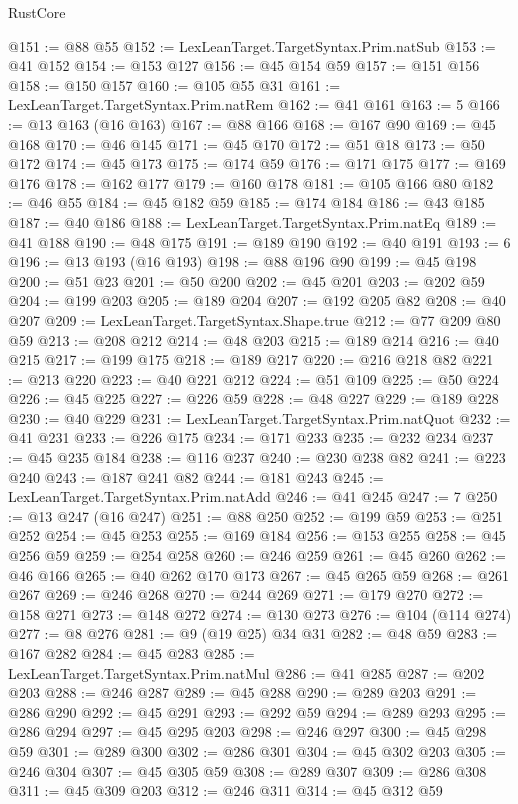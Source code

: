 \begin{lexlean}{RustCore}
\begin{coremodule}
@151 := @88 @55
@152 := LexLeanTarget.TargetSyntax.Prim.natSub
@153 := @41 @152
@154 := @153 @127
@156 := @45 @154 @59
@157 := @151 @156
@158 := @150 @157
@160 := @105 @55 @31
@161 := LexLeanTarget.TargetSyntax.Prim.natRem
@162 := @41 @161
@163 := 5
@166 := @13 @163 (@16 @163)
@167 := @88 @166
@168 := @167 @90
@169 := @45 @168
@170 := @46 @145
@171 := @45 @170
@172 := @51 @18
@173 := @50 @172
@174 := @45 @173
@175 := @174 @59
@176 := @171 @175
@177 := @169 @176
@178 := @162 @177
@179 := @160 @178
@181 := @105 @166 @80
@182 := @46 @55
@184 := @45 @182 @59
@185 := @174 @184
@186 := @43 @185
@187 := @40 @186
@188 := LexLeanTarget.TargetSyntax.Prim.natEq
@189 := @41 @188
@190 := @48 @175
@191 := @189 @190
@192 := @40 @191
@193 := 6
@196 := @13 @193 (@16 @193)
@198 := @88 @196 @90
@199 := @45 @198
@200 := @51 @23
@201 := @50 @200
@202 := @45 @201
@203 := @202 @59
@204 := @199 @203
@205 := @189 @204
@207 := @192 @205 @82
@208 := @40 @207
@209 := LexLeanTarget.TargetSyntax.Shape.true
@212 := @77 @209 @80 @59
@213 := @208 @212
@214 := @48 @203
@215 := @189 @214
@216 := @40 @215
@217 := @199 @175
@218 := @189 @217
@220 := @216 @218 @82
@221 := @213 @220
@223 := @40 @221 @212
@224 := @51 @109
@225 := @50 @224
@226 := @45 @225
@227 := @226 @59
@228 := @48 @227
@229 := @189 @228
@230 := @40 @229
@231 := LexLeanTarget.TargetSyntax.Prim.natQuot
@232 := @41 @231
@233 := @226 @175
@234 := @171 @233
@235 := @232 @234
@237 := @45 @235 @184
@238 := @116 @237
@240 := @230 @238 @82
@241 := @223 @240
@243 := @187 @241 @82
@244 := @181 @243
@245 := LexLeanTarget.TargetSyntax.Prim.natAdd
@246 := @41 @245
@247 := 7
@250 := @13 @247 (@16 @247)
@251 := @88 @250
@252 := @199 @59
@253 := @251 @252
@254 := @45 @253
@255 := @169 @184
@256 := @153 @255
@258 := @45 @256 @59
@259 := @254 @258
@260 := @246 @259
@261 := @45 @260
@262 := @46 @166
@265 := @40 @262 @170 @173
@267 := @45 @265 @59
@268 := @261 @267
@269 := @246 @268
@270 := @244 @269
@271 := @179 @270
@272 := @158 @271
@273 := @148 @272
@274 := @130 @273
@276 := @104 (@114 @274)
@277 := @8 @276
@281 := @9 (@19 @25) @34 @31
@282 := @48 @59
@283 := @167 @282
@284 := @45 @283
@285 := LexLeanTarget.TargetSyntax.Prim.natMul
@286 := @41 @285
@287 := @202 @203
@288 := @246 @287
@289 := @45 @288
@290 := @289 @203
@291 := @286 @290
@292 := @45 @291
@293 := @292 @59
@294 := @289 @293
@295 := @286 @294
@297 := @45 @295 @203
@298 := @246 @297
@300 := @45 @298 @59
@301 := @289 @300
@302 := @286 @301
@304 := @45 @302 @203
@305 := @246 @304
@307 := @45 @305 @59
@308 := @289 @307
@309 := @286 @308
@311 := @45 @309 @203
@312 := @246 @311
@314 := @45 @312 @59

\end{coremodule}
\end{lexlean}
